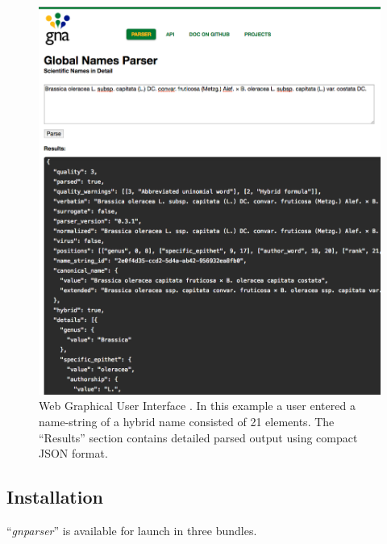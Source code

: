 \documentclass{bmcart}
\begin{document}
\begin{figure}[htbp]
  \begin{center}

    \caption{Web Graphical User Interface \cite{gnparser-web}. In this example
      a user entered a name-string of a hybrid name consisted of 21 elements.
      The ``Results'' section contains detailed parsed output using compact
      JSON format.}\label{figure:webgui}

    \vspace{5mm}
    \includegraphics[scale=0.175]{images/2.png}
  \end{center}
\end{figure}

\subsection*{Installation}

``\textit{gnparser}'' is available for launch in three bundles.
\end{document}
